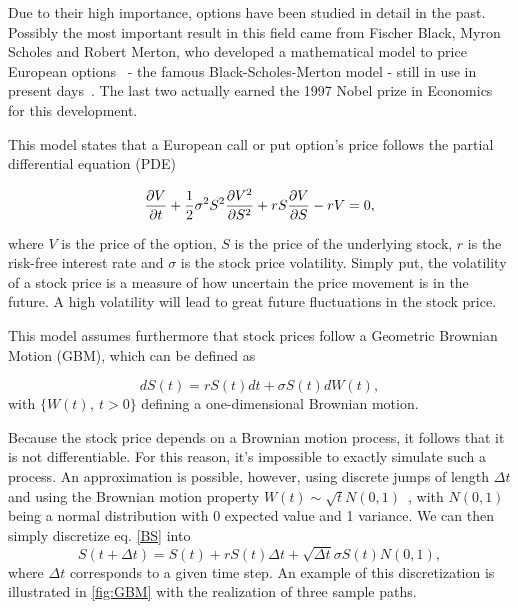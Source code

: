 \documentclass[a4paper,twocolumn,aps,prd,longbibliography,superscriptaddress]{revtex4-1}
\begin{document}
Due to their high importance, options have been studied in detail in the past.
Possibly the most important result in this field came from Fischer Black, Myron Scholes and Robert Merton, who developed a mathematical model to price European options~\cite{Scholes} - the famous Black-Scholes-Merton model - still in use in present days~\cite{Wilmott2}. The last two actually earned the 1997 Nobel prize in Economics for this development.

This model states that a European call or put option's price follows the partial differential equation (PDE)

\begin{equation}\label{BS2}
\pdv{V}{t}+\frac{1}{2}\sigma^2S^2\pdv{V^2}{S^2}+rS\pdv{V}{S}-rV=0,
\end{equation}

\noindent where $V$ is the price of the option, $S$ is the price of the underlying stock, $r$ is the risk-free interest rate and $\sigma$ is the stock price volatility.
Simply put, the volatility of a stock price is a measure of how uncertain the price movement is in the future. A high volatility will lead to great future fluctuations in the stock price.

This model assumes furthermore that stock prices follow a Geometric Brownian Motion (GBM), which can be defined as

\begin{equation}\label{BS}
dS(t)=rS(t)dt+\sigma S(t)dW(t),
\end{equation}
\noindent with $\{W(t),\ t>0\}$ defining a one-dimensional Brownian motion.

Because the stock price depends on a Brownian motion process, it follows that it is not differentiable. For this reason, it's impossible to exactly simulate such a process. An approximation is possible, however, using discrete jumps of length $\Delta t$ and using the Brownian motion property $W(t)\sim \sqrt{t}N(0,1)$~\cite{Mikosch}, with $N(0,1)$ being a normal distribution with 0 expected value and 1 variance.
We can then simply discretize eq. \eqref{BS} into
\begin{equation}
S(t+\Delta t)=S(t)+rS(t)\Delta t+\sqrt{\Delta t}\sigma S(t)N(0,1),
\end{equation}
\noindent where $\Delta t$ corresponds to a given time step. An example of this discretization is illustrated in \autoref{fig:GBM} with the realization of three sample paths.
\end{document}

